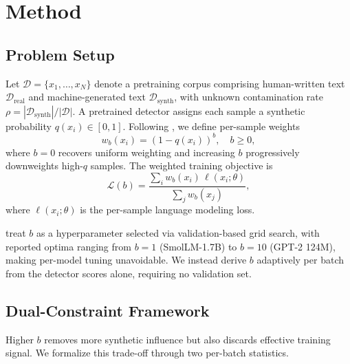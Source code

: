 
\section{Method}
\label{sec:method}

\subsection{Problem Setup}
\label{sec:problem-setup}

Let $\mathcal{D} = \{x_1, \ldots, x_N\}$ denote a pretraining corpus comprising human-written text $\mathcal{D}_{\mathrm{real}}$ and machine-generated text $\mathcal{D}_{\mathrm{synth}}$, with unknown contamination rate $\rho = |\mathcal{D}_{\mathrm{synth}}| / |\mathcal{D}|$.
A pretrained detector assigns each sample a synthetic probability $q(x_i) \in [0, 1]$.
Following \citet{drayson_2025_detection_collapse}, we define per-sample weights
\begin{equation}
  w_b(x_i) = (1 - q(x_i))^b, \quad b \geq 0,
  \label{eq:weight}
\end{equation}
where $b = 0$ recovers uniform weighting and increasing $b$ progressively downweights high-$q$ samples.
The weighted training objective is
\begin{equation}
  \mathcal{L}(b) = \frac{\sum_{i} w_b(x_i) \, \ell(x_i; \theta)}{\sum_{j} w_b(x_j)},
  \label{eq:loss}
\end{equation}
where $\ell(x_i; \theta)$ is the per-sample language modeling loss.

\citet{drayson_2025_detection_collapse} treat $b$ as a hyperparameter selected via validation-based grid search, with reported optima ranging from $b{=}1$ (SmolLM-1.7B) to $b{=}10$ (GPT-2 124M), making per-model tuning unavoidable.
We instead derive $b$ adaptively per batch from the detector scores alone, requiring no validation set.

\subsection{Dual-Constraint Framework}
\label{sec:dual-constraint}

Higher $b$ removes more synthetic influence but also discards effective training signal.
We formalize this trade-off through two per-batch statistics.

